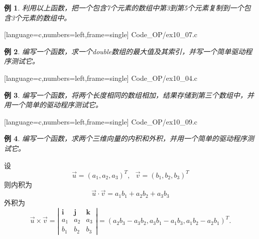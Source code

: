 \documentclass[10pt,notheorems]{beamer}
\newtheorem{li}{例}
\begin{document}
 

\begin{frame}[fragile]
\begin{li} 
利用以上函数，把一个包含7个元素的数组中第3到第5个元素复制到一个包含3个元素的数组中。
\end{li}
\end{frame}

\begin{frame}

[language=c,numbers=left,frame=single]
{Code_OP/ex10_07.c}
\end{frame}


\begin{frame}[fragile]
\begin{li} 
编写一个函数，求一个double数组的最大值及其索引，并写一个简单驱动程序测试它。
\end{li}
\end{frame}

\begin{frame}

[language=c,numbers=left,frame=single]
{Code_OP/ex10_04.c}
\end{frame}

 

\begin{frame}[fragile]
\begin{li} 
编写一个函数，将两个长度相同的数组相加，结果存储到第三个数组中，并用一个简单的驱动程序测试它。
\end{li}
\end{frame}

\begin{frame}

[language=c,numbers=left,frame=single]
{Code_OP/ex10_09.c}
\end{frame}


 


\begin{frame}[fragile]
\begin{li} 
编写一个函数，求两个三维向量的内积和外积，并用一个简单的驱动程序测试它。
\end{li}
设
$$
\vec u = (a_1,a_2,a_3)^T, ~~~ 
\vec v = (b_1,b_2,b_3)^T
$$
则内积为
$$
\vec u \cdot \vec v = a_1b_1+a_2b_2+a_3b_3
$$
外积为
$$
\vec u \times \vec v = 
\left|
\begin{array}{ccc}
\mathbf i & \mathbf j & \mathbf k \\
a_1 & a_2 & a_3 \\
b_1 & b_2 & b_3
\end{array}
\right| = (a_2b_3-a_3b_2, a_3b_1-a_1b_3, a_1b_2-a_2b_1)^T.
$$
\end{frame}
\end{document}
